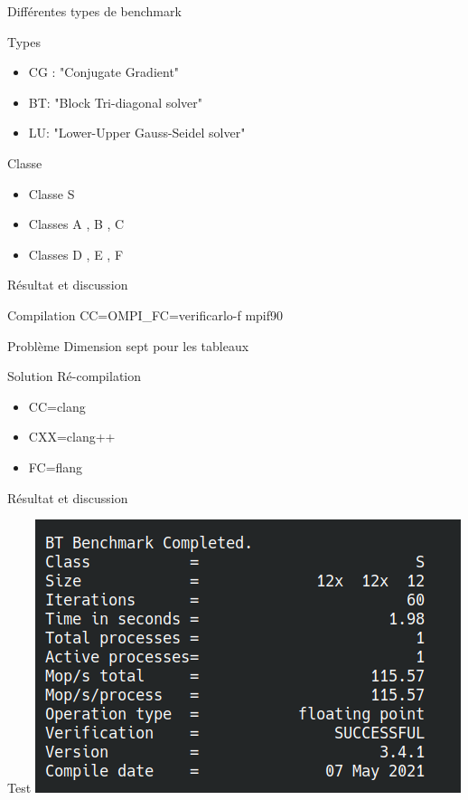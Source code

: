 \documentclass{beamer}
\begin{document}
\begin{frame}{ Différentes types de benchmark}

  \begin{block}{Types}
    \begin{itemize}
    \item CG : "Conjugate Gradient" 
    \item BT: "Block Tri-diagonal solver"
    \item LU: "Lower-Upper Gauss-Seidel solver"
    \end{itemize}
  \end{block}
  
  \begin{block}{Classe}
    \begin{itemize}
    \item Classe S 
    \item  Classes A , B , C 
    \item Classes D , E , F
    \end{itemize}
  \end{block}
  
\end{frame}

\begin{frame}{ Résultat et discussion}

  \begin{block}{Compilation}
    CC=OMPI\_FC=verificarlo-f  mpif90
  \end{block}
  
  \begin{block}{Problème}
    Dimension sept pour les tableaux
  \end{block}
  
  \begin{block}{Solution}
    Ré-compilation
    \begin{itemize}
    \item CC=clang
    \item CXX=clang++
    \item FC=flang
    \end{itemize}
  \end{block}

\end{frame}

\begin{frame}{Résultat et discussion}

  \begin{block}{Test}
    \includegraphics[width=0.6\linewidth]{../ressources/btcompleted.png}
  \end{block}

\end{frame}
\end{document}
